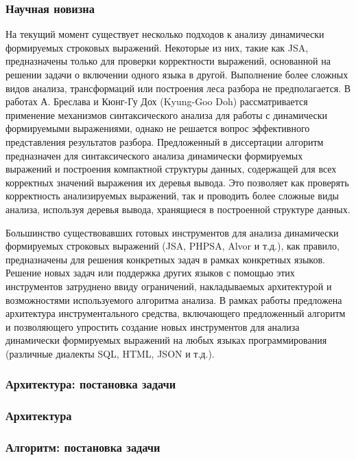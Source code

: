 \documentclass{beamer}
\begin{document}
\begin{frame}
	\transwipe[direction=90]
	\frametitle{Научная новизна}
        На текущий момент существует несколько подходов к анализу динамически формируемых строковых выражений. Некоторые из них, такие как JSA, предназначены только для проверки корректности выражений, основанной на решении задачи о включении одного языка в другой. Выполнение более сложных видов анализа, трансформаций или построения леса разбора не предполагается. В работах А. Бреслава и Кюнг-Гу Дох (Kyung-Goo Doh) рассматривается применение механизмов синтаксического анализа для работы с динамически формируемыми выражениями, однако не решается вопрос эффективного представления результатов разбора. Предложенный в диссертации алгоритм предназначен для синтаксического анализа динамически формируемых выражений и построения компактной структуры данных, содержащей для всех корректных значений выражения их деревья вывода. Это позволяет как проверять корректность анализируемых выражений, так и проводить более сложные виды анализа, используя деревья вывода, хранящиеся в построенной структуре данных.
 
        Большинство существовавших готовых инструментов для анализа динамически формируемых строковых выражений (JSA, PHPSA, Alvor и т.д.), как правило, предназначены для решения конкретных задач в рамках конкретных языков. Решение новых задач или поддержка других языков с помощью этих инструментов затруднено ввиду ограничений, накладываемых архитектурой и возможностями используемого алгоритма анализа. В рамках работы предложена архитектура инструментального средства, включающего предложенный алгоритм и позволяющего упростить создание новых инструментов для анализа динамически формируемых выражений на любых языках программирования (различные диалекты SQL, HTML, JSON и т.д.).

\end{frame}

\begin{frame}
	\transwipe[direction=90]
	\frametitle{Архитектура: постановка задачи}
\end{frame}

\begin{frame}
	\transwipe[direction=90]
	\frametitle{Архитектура}
\end{frame}

\begin{frame}
	\transwipe[direction=90]
	\frametitle{Алгоритм: постановка задачи}
\end{frame}
\end{document}
